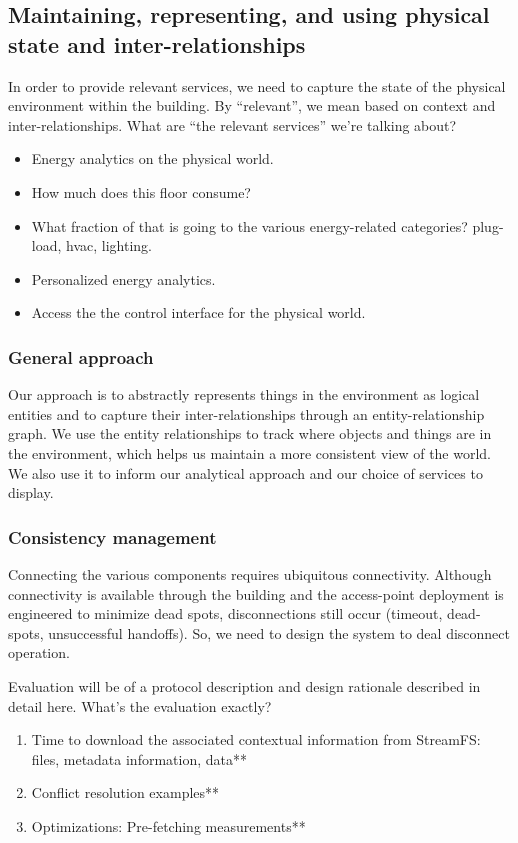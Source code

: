\subsection{Maintaining, representing, and using physical state and inter-relationships}
In order to provide relevant services, we need to capture the state of the physical environment within the building.  By “relevant”, we mean based on context and inter-relationships.  What are “the relevant services” we’re talking about?

\begin{itemize}
\item Energy analytics on the physical world.
\item How much does this floor consume?
\item What fraction of that is going to the various energy-related categories?  plug-load, hvac, lighting.
\item Personalized energy analytics.
\item Access the the control interface for the physical world.
\end{itemize}

\subsubsection{General approach}
Our approach is to abstractly represents things in the environment as logical entities and to capture their inter-relationships through an entity-relationship graph.  We use the entity relationships to track where objects and things are in the environment, which helps us maintain a more consistent view of the world.  We also use  it to inform our analytical approach and our choice of services to display.

\subsubsection{Consistency management}
Connecting the various components requires ubiquitous connectivity.  Although connectivity is available through the building and the access-point deployment is engineered to minimize dead spots, disconnections still occur (timeout, dead-spots, unsuccessful handoffs).  So, we need to design the system to deal disconnect operation.

Evaluation will be of a protocol description and design rationale described in detail here.
What’s the evaluation exactly?

\begin{enumerate}
\item Time to download the associated contextual information from StreamFS: files, metadata information, data**
\item Conflict resolution examples**
\item Optimizations: Pre-fetching measurements**
\end{enumerate}


